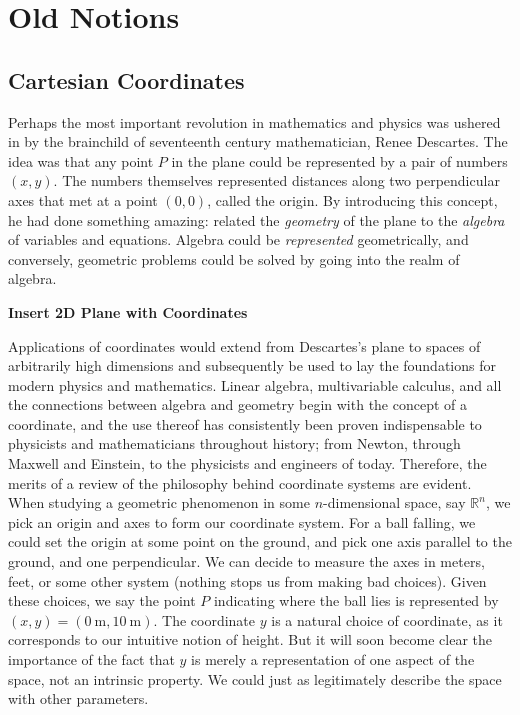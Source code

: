 \chapter{Old Notions}
\section{Cartesian Coordinates}
Perhaps the most important revolution in mathematics and physics was ushered in by the brainchild of seventeenth century mathematician, Renee Descartes. The idea was that any point $P$ in the plane could be represented by a pair of numbers $(x,y)$. The numbers themselves represented distances along two perpendicular axes that met at a point $(0,0)$, called the origin. By introducing this concept, he had done something amazing: related the \emph{geometry} of the plane to the \emph{algebra} of variables and equations. Algebra could be \emph{represented} geometrically, and conversely, geometric problems could be solved by going into the realm of algebra. 
	
	\textbf{Insert 2D Plane with Coordinates}
	
	Applications of coordinates would extend from Descartes's plane to spaces of arbitrarily high dimensions and subsequently be used to lay the foundations for modern physics and mathematics. Linear algebra, multivariable calculus, and all the connections between algebra and geometry begin with the concept of a coordinate, and the use thereof has consistently been proven indispensable to physicists and mathematicians throughout history; from Newton, through Maxwell and Einstein, to the physicists and engineers of today.  Therefore, the merits of a review of the philosophy behind coordinate systems are evident.\\
	
	When studying a geometric phenomenon in some $n$-dimensional space, say $\mathbb{R}^n$, we pick an origin and axes to form our coordinate system. For a ball falling, we could set the origin at some point on the ground, and pick one axis parallel to the ground, and one perpendicular. We can decide to measure the axes in meters, feet, or some other system (nothing stops us from making bad choices). Given these choices, we say the point $P$ indicating where the ball lies is represented by $(x,y)=(0~ \mathrm m,10~ \mathrm m)$.  The coordinate $y$ is a natural choice of coordinate, as it corresponds to our intuitive notion of height.  But it will soon become clear the importance of the fact that $y$ is merely a representation of one aspect of the space, not an intrinsic property.  We could just as legitimately describe the space with other parameters.
	
